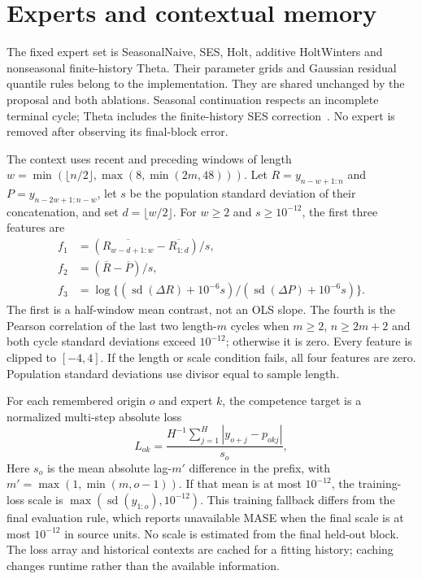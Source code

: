 \documentclass[11pt,a4paper]{article}
\begin{document}


\section{Experts and contextual memory}
The fixed expert set is SeasonalNaive, SES, Holt, additive HoltWinters and nonseasonal finite-history Theta. Their parameter grids and Gaussian residual quantile rules belong to the implementation. They are shared unchanged by the proposal and both ablations. Seasonal continuation respects an incomplete terminal cycle; Theta includes the finite-history SES correction~\cite{theta}. No expert is removed after observing its final-block error.

The context uses recent and preceding windows of length $w=\min(\lfloor n/2\rfloor,\max(8,\min(2m,48)))$. Let $R=y_{n-w+1:n}$ and $P=y_{n-2w+1:n-w}$, let $s$ be the population standard deviation of their concatenation, and set $d=\lfloor w/2\rfloor$. For $w\ge2$ and $s\ge10^{-12}$, the first three features are
\begin{align}
f_1&=(\overline{R_{w-d+1:w}}-\overline{R_{1:d}})/s,\\
f_2&=(\overline R-\overline P)/s,\\
f_3&=\log\{(\operatorname{sd}(\Delta R)+10^{-6}s)/(\operatorname{sd}(\Delta P)+10^{-6}s)\}.
\end{align}
The first is a half-window mean contrast, not an OLS slope. The fourth is the Pearson correlation of the last two length-$m$ cycles when $m\ge2$, $n\ge2m+2$ and both cycle standard deviations exceed $10^{-12}$; otherwise it is zero. Every feature is clipped to $[-4,4]$. If the length or scale condition fails, all four features are zero. Population standard deviations use divisor equal to sample length.

For each remembered origin $o$ and expert $k$, the competence target is a normalized multi-step absolute loss
\begin{equation}
L_{ok}=\frac{H^{-1}\sum_{j=1}^H|y_{o+j}-p_{okj}|}{s_o},
\end{equation}
Here $s_o$ is the mean absolute lag-$m\prime$ difference in the prefix, with $m\prime=\max(1,\min(m,o-1))$. If that mean is at most $10^{-12}$, the training-loss scale is $\max(\operatorname{sd}(y_{1:o}),10^{-12})$. This training fallback differs from the final evaluation rule, which reports unavailable MASE when the final scale is at most $10^{-12}$ in source units. No scale is estimated from the final held-out block. The loss array and historical contexts are cached for a fitting history; caching changes runtime rather than the available information.
\end{document}
